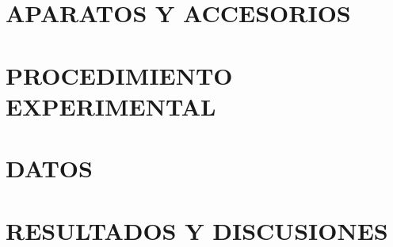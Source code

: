 \documentclass[10pt]{article}
\begin{document}
\section{APARATOS Y ACCESORIOS}



\blindmathpaper %


\newpage
\setcounter{equation}{0} %
\setcounter{figure}{0} %
\setcounter{table}{0} %
\section{PROCEDIMIENTO EXPERIMENTAL}



\blindmathpaper %


\newpage
\setcounter{equation}{0} %
\setcounter{figure}{0} %
\setcounter{table}{0} %
\section{DATOS}



\blindmathpaper %


\newpage
\setcounter{equation}{0} %
\setcounter{figure}{0} %
\setcounter{table}{0} %
\section{RESULTADOS Y DISCUSIONES}
\end{document}
